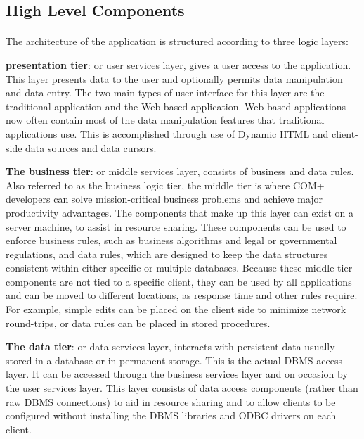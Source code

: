 \subsection{High Level Components} 
\paragraph{}The architecture of the application is structured according to three logic layers:


 \textbf{ presentation tier}: or user services layer, gives a user access to the application. This layer presents data to the user and optionally permits data manipulation and data entry. The two main types of user interface for this layer are the traditional application and the Web-based application. Web-based applications now often contain most of the data manipulation features that traditional applications use. This is accomplished through use of Dynamic HTML and client-side data sources and data cursors.

 \textbf{The business tier}: or middle services layer, consists of business and data rules. Also referred to as the business logic tier, the middle tier is where COM+ developers can solve mission-critical business problems and achieve major productivity advantages. The components that make up this layer can exist on a server machine, to assist in resource sharing. These components can be used to enforce business rules, such as business algorithms and legal or governmental regulations, and data rules, which are designed to keep the data structures consistent within either specific or multiple databases. Because these middle-tier components are not tied to a specific client, they can be used by all applications and can be moved to different locations, as response time and other rules require. For example, simple edits can be placed on the client side to minimize network round-trips, or data rules can be placed in stored procedures.

\textbf{The data tier}: or data services layer, interacts with persistent data usually stored in a database or in permanent storage. This is the actual DBMS access layer. It can be accessed through the business services layer and on occasion by the user services layer. This layer consists of data access components (rather than raw DBMS connections) to aid in resource sharing and to allow clients to be configured without installing the DBMS libraries and ODBC drivers on each client.

